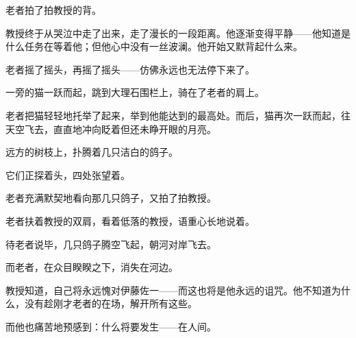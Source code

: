 
\AddSymbolsH
\pagecolor{MidnightBlue!20!Gray}
\color{white}
\quad\quad \lettrine[,lraise=0.2,lhang=0.5]{\textbf{}}{}老者拍了拍教授的背。

教授终于从哭泣中走了出来，走了漫长的一段距离。他逐渐变得平静——他知道是什么任务在等着他；但他心中没有一丝波澜。他开始又默背起什么来。

\begin{thrm}
\end{thrm}

老者摇了摇头，再摇了摇头——仿佛永远也无法停下来了。

一旁的猫一跃而起，跳到大理石围栏上，骑在了老者的肩上。

老者把猫轻轻地托举了起来，举到他能达到的最高处。而后，猫再次一跃而起，往天空飞去，直直地冲向眨着但还未睁开眼的月亮。

远方的树枝上，扑腾着几只洁白的鸽子。

它们正探着头，四处张望着。

老者充满默契地看向那几只鸽子，又拍了拍教授。

老者扶着教授的双肩，看着低落的教授，语重心长地说着。


待老者说毕，几只鸽子腾空飞起，朝河对岸飞去。

而老者，在众目睽睽之下，消失在河边。

教授知道，自己将永远愧对伊藤佐一——而这也将是他永远的诅咒。他不知道为什么，没有趁刚才老者的在场，解开所有这些。

而他也痛苦地预感到：什么将要发生——在人间。


